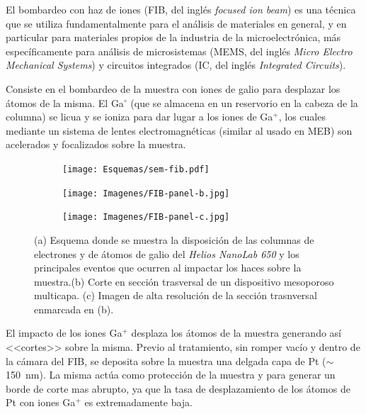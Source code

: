		El bombardeo con haz de iones (FIB, del inglés \textit{focused ion beam}) es una técnica que se utiliza fundamentalmente para el análisis de materiales en general, y en particular para materiales propios de la industria de la microelectrónica, más específicamente para análisis de microsistemas (MEMS, del inglés \textit{Micro Electro Mechanical Systems}) y circuitos integrados (IC, del inglés \textit{Integrated Circuits}). 

		Consiste en el bombardeo de la muestra con iones de galio para desplazar los átomos de la misma. El Ga$^{\circ}$ (que se almacena en un	reservorio en la cabeza de la columna) se licua y se ioniza para dar lugar a los iones de Ga${^+}$, los cuales mediante un sistema de lentes electromagnéticas (similar al usado en MEB) son acelerados y focalizados sobre la muestra. 

		\begin{figure}[b!]
			  		  \begin{subfigure}[t]{\textwidth}
			  		  \centering\texttt{[image: Esquemas/sem-fib.pdf]}
			  		  \end{subfigure}
			  		  \begin{subfigure}[t]{0.498\textwidth}
			  		  \texttt{[image: Imagenes/FIB-panel-b.jpg]}
			  		  \end{subfigure}
			  		  \begin{subfigure}[t]{0.498\textwidth}
			  		  \texttt{[image: Imagenes/FIB-panel-c.jpg]}
			  		  \end{subfigure}
			  		  \caption[Esquema de las microscopias FIB/SEM]{(a) Esquema donde se muestra la disposición de las columnas de electrones y de átomos de galio del \textit{Helios NanoLab 650} y los principales eventos que ocurren al impactar los haces sobre la muestra.(b) Corte en sección trasversal de un dispositivo mesoporoso multicapa. (c) Imagen de alta resolución de la sección trasnversal enmarcada en (b).}
			  		  \label{esq:sem-fib}
			  		  \end{figure}

		El impacto de los iones Ga${^+}$ desplaza los átomos de la muestra generando así <<cortes>> sobre la misma. Previo al tratamiento, sin romper vacío y dentro de la cámara del FIB, se deposita sobre la muestra una delgada capa de Pt ($\sim$\SI{150}{\nm}). La misma actúa como protección de la muestra y para generar un borde de corte mas abrupto, ya que la tasa de desplazamiento de los átomos de Pt con iones Ga${^+}$ es extremadamente baja.\cite{Giannuzzi2005,Orloff1996} 

